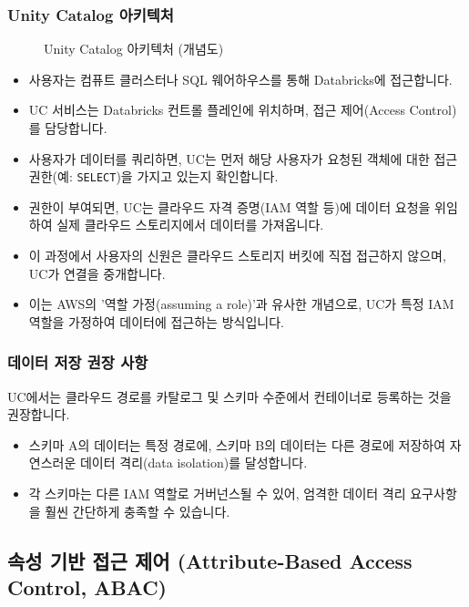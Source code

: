 \documentclass[11pt,a4paper]{article}
\theoremstyle{definition}
\begin{document}
\subsubsection*{Unity Catalog 아키텍처}
\begin{figure}[h!]
    \centering
    \caption{Unity Catalog 아키텍처 (개념도)}
    \label{fig:uc_arch}
\end{figure}
\begin{itemize}
    \item 사용자는 컴퓨트 클러스터나 SQL 웨어하우스를 통해 Databricks에 접근합니다.
    \item UC 서비스는 Databricks 컨트롤 플레인에 위치하며, 접근 제어(Access Control)를 담당합니다.
    \item 사용자가 데이터를 쿼리하면, UC는 먼저 해당 사용자가 요청된 객체에 대한 접근 권한(예: \texttt{SELECT})을 가지고 있는지 확인합니다.
    \item 권한이 부여되면, UC는 클라우드 자격 증명(IAM 역할 등)에 데이터 요청을 위임하여 실제 클라우드 스토리지에서 데이터를 가져옵니다.
    \item 이 과정에서 사용자의 신원은 클라우드 스토리지 버킷에 직접 접근하지 않으며, UC가 연결을 중개합니다.
\item 이는 AWS의 '역할 가정(assuming a role)'과 유사한 개념으로, UC가 특정 IAM 역할을 가정하여 데이터에 접근하는 방식입니다.
\end{itemize}

\subsubsection*{데이터 저장 권장 사항}
UC에서는 클라우드 경로를 카탈로그 및 스키마 수준에서 컨테이너로 등록하는 것을 권장합니다.
\begin{itemize}
    \item 스키마 A의 데이터는 특정 경로에, 스키마 B의 데이터는 다른 경로에 저장하여 자연스러운 데이터 격리(data isolation)를 달성합니다.
    \item 각 스키마는 다른 IAM 역할로 거버넌스될 수 있어, 엄격한 데이터 격리 요구사항을 훨씬 간단하게 충족할 수 있습니다.
\end{itemize}

\newpage
\subsection*{속성 기반 접근 제어 (Attribute-Based Access Control, ABAC)}
\end{document}
